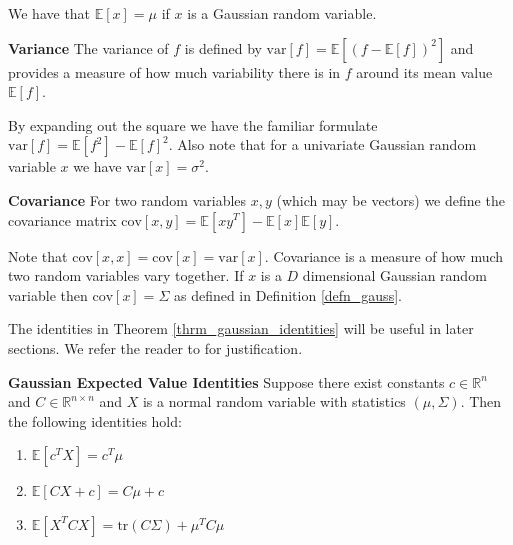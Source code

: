 \documentclass[../masters.tex]{subfiles}
\begin{document}
We have that $\mathbb{E}[x]=\mu$ if $x$ is a Gaussian random variable.
\begin{defn}
\textbf{Variance} The variance of $f$ is defined by $\text{var}[f] = \mathbb{E}[(f - \mathbb{E}[f])^2]$ and provides a measure of how much variability there is in $f$ around its mean value $\mathbb{E}[f]$.
\label{def_variance}
\end{defn}
By expanding out the square we have the familiar formulate $\text{var}[f] = \mathbb{E}[f^2] - \mathbb{E}[f]^2$. Also note that for a  univariate Gaussian random variable $x$ we have $\text{var}[x] =\sigma^2$.
\begin{defn}
\textbf{Covariance} For two random variables $x,y$ (which may be vectors) we define the covariance matrix $\text{cov}[x,y] = \mathbb{E}[xy^T] - \mathbb{E}[x]\mathbb{E}[y]$.
\label{def_covariance}
\end{defn}
Note that $\text{cov}[x,x]=\text{cov}[x]=\text{var}[x]$. Covariance is a measure of how much two random variables vary together. If $x$ is a $D$ dimensional Gaussian random variable then $\text{cov}[x] = \Sigma$ as defined in Definition \ref{defn_gauss}.

The identities in Theorem \ref{thrm_gaussian_identities} will be useful in later sections. We refer the reader to \cite{davidian} for justification.
\begin{thrm}
\textbf{Gaussian Expected Value Identities}
Suppose there exist constants $c \in \mathbb{R}^n$ and $C \in \mathbb{R}^{n \times n}$ and $X$ is a normal random variable with statistics $(\mu, \Sigma)$. Then the following identities hold:
\begin{enumerate}
\item
$\mathbb{E}[c^TX] = c^T\mu$
\item
$\mathbb{E}[CX+c] = C\mu + c$
\item
$\mathbb{E}[X^TCX] = \text{tr}(C\Sigma) + \mu^TC\mu$
\end{enumerate}
\label{thrm_gaussian_identities}
\end{thrm}  
\end{document}
